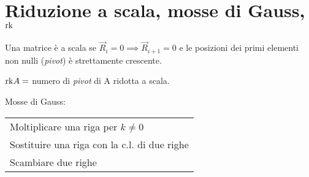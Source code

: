 \section{Riduzione a scala, mosse di Gauss, $\mathrm{rk}$}
Una matrice è a scala se $\vec{R}_i = 0 \implies \vec{R}_{i+1} = 0$ e le posizioni dei primi elementi non nulli (\emph{pivot})
è strettamente crescente.

$\mathrm{rk} A = $ numero di \emph{pivot} di A ridotta a scala.

Mosse di Gauss:

\begin{tabular}{l}
	Moltiplicare una riga per $k \ne 0$ \\
	Sostituire una riga con la c.l. di due righe \\
	Scambiare due righe \\
\end{tabular}
